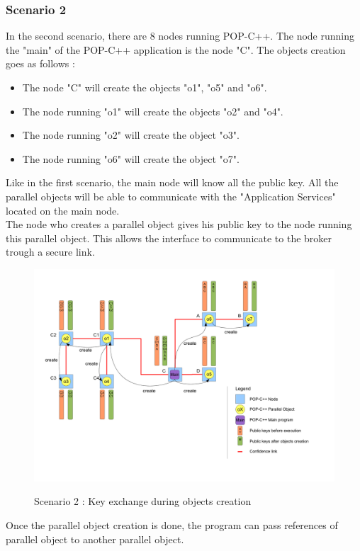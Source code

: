 \subsubsection{Scenario 2}
In the second scenario, there are 8 nodes running POP-C++. The node running the "main" of the POP-C++ application is the node "C". The objects creation goes as follows : 
\begin{itemize}
\item The node "C" will create the objects "o1", "o5" and "o6". 
\item The node running "o1" will create the objects "o2" and "o4". 
\item The node running "o2" will create the object "o3".
\item The node running "o6" will create the object "o7".
\end{itemize}
Like in the first scenario, the main node will know all the public key. All the parallel objects will be able to communicate with the "Application Services" located on the main node.\\
The node who creates a parallel object gives his public key to the node running this parallel object. This allows the interface to communicate to the broker trough a secure link. 

\begin{figure}[ht]
	\caption{Scenario 2 : Key exchange during objects creation}
  	\centering
	\includegraphics[width=1.0\textwidth]{../sc2-1.pdf}
	\label{fig:kex_object_creation_sc2}
\end{figure}
Once the parallel object creation is done, the program can pass references of parallel object to another parallel object.

